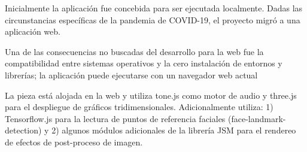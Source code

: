 
Inicialmente la aplicación fue concebida para ser ejecutada localmente. Dadas las circunstancias específicas de la pandemia de COVID-19, el proyecto migró a una aplicación web.

Una de las consecuencias no buscadas del desarrollo para la web fue la compatibilidad entre sistemas operativos y la cero instalación de entornos y librerías; la aplicación puede ejecutarse con un navegador web actual 

La pieza está alojada en la web y utiliza tone.js como motor de audio y three.js para el despliegue de gráficos tridimensionales. Adicionalmente utiliza: 1) Tensorflow.js para la lectura de puntos de referencia faciales (face-landmark-detection) y 2) algunos módulos adicionales de la librería JSM para el rendereo de efectos de post-proceso de imagen.
